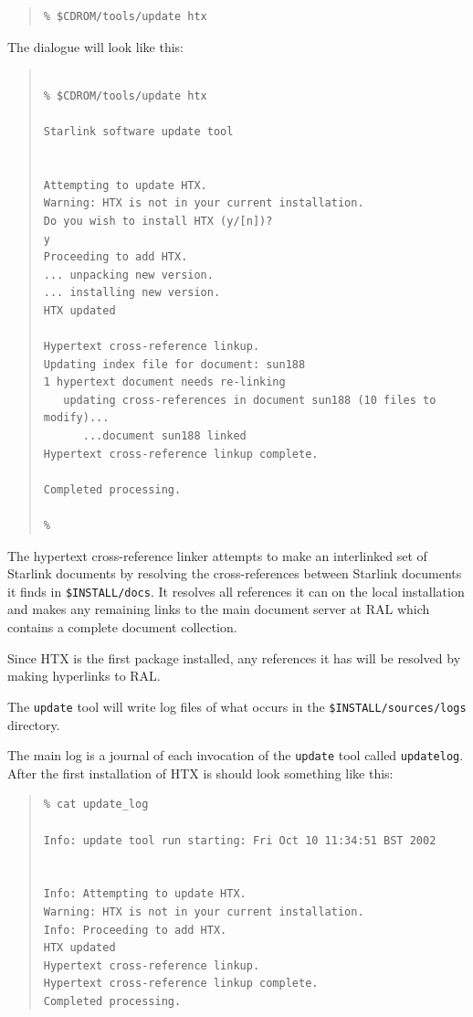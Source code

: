 \documentclass[twoside,11pt]{article}
\renewcommand{\_}{\texttt{\symbol{95}}}
\begin{document}
\begin{quote}
\begin{verbatim}
% $CDROM/tools/update htx
\end{verbatim}
\end{quote}

The dialogue will look like this:

\begin{quote}
\begin{verbatim}

% $CDROM/tools/update htx

Starlink software update tool


Attempting to update HTX.
Warning: HTX is not in your current installation.
Do you wish to install HTX (y/[n])?
y
Proceeding to add HTX.
... unpacking new version.
... installing new version.
HTX updated

Hypertext cross-reference linkup.
Updating index file for document: sun188
1 hypertext document needs re-linking
   updating cross-references in document sun188 (10 files to modify)...
      ...document sun188 linked
Hypertext cross-reference linkup complete.

Completed processing.

%
\end{verbatim}
\end{quote}

The hypertext cross-reference linker attempts to make an interlinked
set of Starlink documents by resolving the cross-references between
Starlink documents it finds in \texttt{\$INSTALL/docs}.  It resolves
all references it can on the local installation and makes any remaining
links to the main document server at RAL which contains a complete
document collection.

Since HTX is the first package installed, any references it has will be
resolved by making hyperlinks to RAL.

The \texttt{update} tool will write log files of what occurs in the
\texttt{\$INSTALL/sources/logs} directory.

The main log is a journal of each invocation of the \texttt{update} tool
called \texttt{update\_log}.  After the first installation of HTX is
should look something like this:

\begin{quote}
\begin{verbatim}
% cat update_log

Info: update tool run starting: Fri Oct 10 11:34:51 BST 2002


Info: Attempting to update HTX.
Warning: HTX is not in your current installation.
Info: Proceeding to add HTX.
HTX updated
Hypertext cross-reference linkup.
Hypertext cross-reference linkup complete.
Completed processing.
\end{verbatim}
\end{quote}
\end{document}
